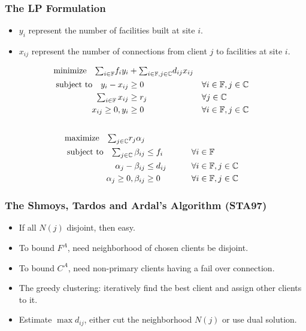 \documentclass[hyperref, xcolor=dvipsnames]{beamer}
\begin{document}
\begin{frame}
  \frametitle{The LP Formulation}
  \begin{itemize}
  \item $y_i$ represent the number of facilities built at site $i$.
  \item $x_{ij}$ represent the number of connections from client $j$
    to facilities at site $i$.
  \end{itemize}
  \begin{alignat}{3}
    \textrm{minimize}\quad \textstyle{\sum_{i\in \mathbb{F}}}f_iy_i &+ \textstyle{\sum_{i\in \mathbb{F}, j\in \mathbb{C}}}d_{ij}x_{ij}&\label{eqn:fac_primal}
    \\ \notag
    \textrm{subject to}\quad y_i - x_{ij} &\geq 0  & &\forall i\in \mathbb{F}, j\in \mathbb{C} 
    \\ \notag
    \textstyle{\sum_{i\in \mathbb{F}} x_{ij}} &\geq r_j & &\forall j\in \mathbb{C}
    \\ \notag
    x_{ij} \geq 0, y_i &\geq 0 & &\forall i\in \mathbb{F}, j\in \mathbb{C} 
    \\ \notag
  \end{alignat}
  \begin{alignat}{3}
    \textrm{maximize}\quad \textstyle{\sum_{j\in \mathbb{C}}} r_j\alpha_j&\label{eqn:fac_dual}  
    \\ \notag
    \textrm{subject to} \quad \textstyle{
      \sum_{j\in \mathbb{C}}\beta_{ij}} &\leq f_i  &\quad\quad			&\forall i \in \mathbb{F}  
    \\ \notag
    \alpha_{j} - \beta_{ij} 	&\leq  d_{ij}       &                 & \forall i\in \mathbb{F}, j\in \mathbb{C} 
    \\ \notag
    \alpha_j \geq 0, \beta_{ij} &\geq 0           &            & \forall i\in \mathbb{F}, j\in \mathbb{C}
  \end{alignat}
\end{frame}

\begin{frame}
  \frametitle{The Shmoys, Tardos and Ardal's Algorithm (STA97)}
  \begin{itemize}
  \item If all $N(j)$ disjoint, then easy.
  \item To bound $F^A$, need neighborhood of chosen clients be disjoint.
  \item To bound $C^A$, need non-primary clients having a fail over connection.
  \end{itemize}

  \begin{itemize}
  \item The greedy clustering: iteratively find the best client and assign other clients to it.
  \item Estimate $\max d_{ij}$, either cut the neighborhood $N(j)$ or use dual solution.
  \end{itemize}
\end{frame}
\end{document}
